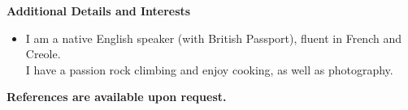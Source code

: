\documentclass[letterpaper,11pt]{article}
\newcommand{\resheading}[1]{{\large \colorbox{mygrey}
                            {\begin{minipage}{\textwidth}
                            {\textbf{#1 \vphantom{p\^{E}}}}
                            \end{minipage}}}
}
\begin{document}
\resheading{Additional Details and Interests}
\begin{itemize}
  \item[] I am a native English speaker (with British Passport), fluent in French and Creole.\\
          I have a passion rock climbing and enjoy cooking, as well as photography. \\
\end{itemize}

\textbf{References are available upon request.}
\end{document}
